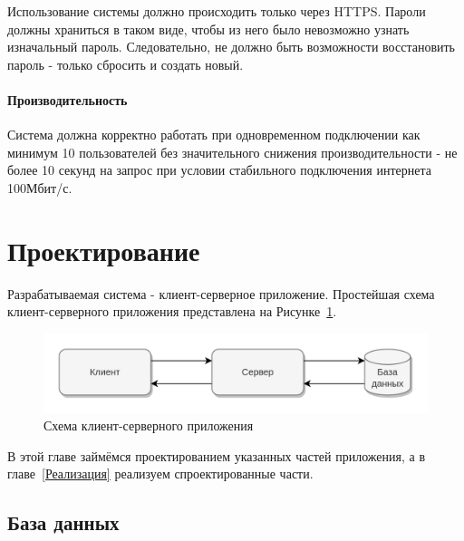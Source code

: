 \documentclass[a4paper,article]{article}
\begin{document}
    Использование системы должно происходить только через HTTPS. Пароли должны храниться в таком виде, чтобы из него было невозможно узнать изначальный пароль. Следовательно, не должно быть возможности восстановить пароль - только сбросить и создать новый.

    \paragraph{Производительность}\label{ТЗ. Производительность}

    Система должна корректно работать при одновременном подключении как минимум 10 пользователей без значительного снижения производительности - не более 10 секунд на запрос при условии стабильного подключения интернета 100Мбит/с.

    \pagestyle{plain}

    \newpage

    \section{Проектирование}

    Разрабатываемая система - клиент-серверное приложение. Простейшая схема клиент-серверного приложения представлена на Рисунке~\ref{fig:Схема клиент-серверного приложения}.

    \begin{figure}[h]

        \centering

        \includegraphics[width=0.8\linewidth]{Схема клиент-серверного приложения.png}

        \caption{\centering Схема клиент-серверного приложения}

        \label{fig:Схема клиент-серверного приложения}

    \end{figure}

    В этой главе займёмся проектированием указанных частей приложения, а в главе~\ref{Реализация} реализуем спроектированные части.

    \subsection{База данных}
\end{document}
